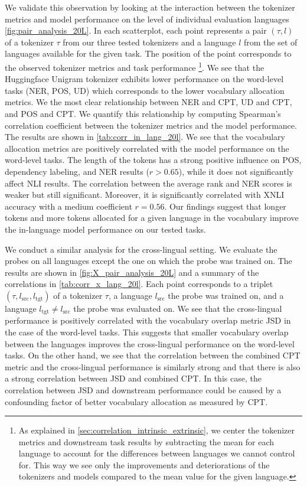 We validate this observation by looking at the interaction between the tokenizer metrics and model performance on the level of individual evaluation languages \autoref{fig:pair_analysis_20L}. In each scatterplot, each point represents a pair $(\tau, l)$ of a tokenizer $\tau$ from our three tested tokenizers and a language $l$ from the set of languages available for the given task. The position of the point corresponds to the observed tokenizer metrics and task performance \footnote{As explained in \autoref{sec:correlation_intrinsic_extrinsic}, we center the tokenizer metrics and downstream task results by subtracting the mean for each language to account for the differences between languages we cannot control for. This way we see only the improvements and deteriorations of the tokenizers and models compared to the mean value for the given language.}.
  We see that the Huggingface Unigram tokenizer exhibits lower performance on the word-level tasks (NER, POS, UD) which corresponds to the lower vocabulary allocation metrics. We the most clear relationship between NER and CPT, UD and CPT, and POS and CPT. We quantify this relationship by computing Spearman's correlation coefficient between the tokenizer metrics and the model performance. The results are shown in \autoref{tab:corr_in_lang_20l}. We see that the vocabulary allocation metrics are positively correlated with the model performance on the word-level tasks. The length of the tokens has a strong positive influence on POS, dependency labeling, and NER results ($r > 0.65$), while it does not significantly affect NLI results. The correlation between the average rank and NER scores is weaker but still significant. Moreover, it is significantly correlated with XNLI accuracy with a medium coefficient $r = 0.56$. Our findings suggest that longer tokens and more tokens allocated for a given language in the vocabulary improve the in-language model performance on our tested tasks. 

We conduct a similar analysis for the cross-lingual setting. We evaluate the probes on all languages except the one on which the probe was trained on. The results are shown in \autoref{fig:X_pair_analysis_20L} and a summary of the correlations in \autoref{tab:corr_x_lang_20l}. Each point corresponds to a triplet $(\tau, l_\mathrm{src}, l_\mathrm{tgt})$ of a tokenizer $\tau$, a language $l_\mathrm{src}$ the probe was trained on, and a language $l_\mathrm{tgt} \neq l_\mathrm{src}$ the probe was evaluated on. We see that the cross-lingual performance is positively correlated with the vocabulary overlap metric JSD in the case of the word-level tasks. This suggests that smaller vocabulary overlap between the languages improves the cross-lingual performance on the word-level tasks. On the other hand, we see that the correlation between the combined CPT metric and the cross-lingual performance is similarly strong and that there is also a strong correlation between JSD and combined CPT. In this case, the correlation between JSD and downstream performance could be caused by a confounding factor of better vocabulary allocation as measured by CPT.

